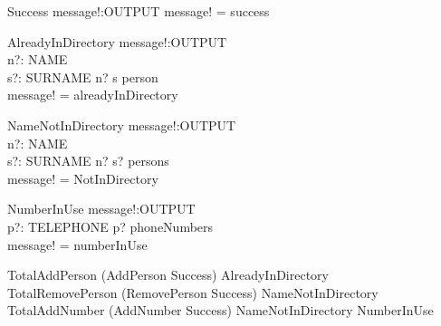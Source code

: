 \documentclass{article}
\begin{document}
\begin{schema}{Success}
message!:OUTPUT
\where
message! = success
\end{schema}

\begin{schema}{AlreadyInDirectory}
message!:OUTPUT \\
n?: NAME \\
s?: SURNAME
\where
n? \mapsto s \in person \\
message! = alreadyInDirectory
\end{schema}

\begin{schema}{NameNotInDirectory}
message!:OUTPUT \\
n?: NAME \\
s?: SURNAME
\where
n? \mapsto s? \notin persons \\
message! = NotInDirectory
\end{schema}

\begin{schema}{NumberInUse}
message!:OUTPUT \\
p?: TELEPHONE
\where
p? \in \ran phoneNumbers \\
message! = numberInUse
\end{schema}

\begin{zed}
TotalAddPerson  (AddPerson \land Success) 
\lor AlreadyInDirectory \\
TotalRemovePerson  (RemovePerson \land Success)
 \lor NameNotInDirectory \\
TotalAddNumber  (AddNumber \land Success) 
\lor NameNotInDirectory \lor NumberInUse \\
\end{zed}
\end{document}
